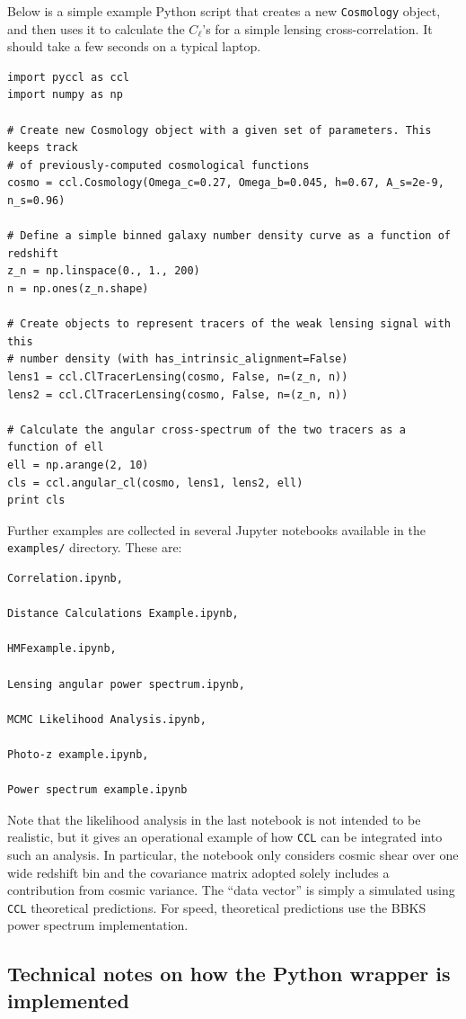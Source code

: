 \documentclass[\docopts]{\docclass}
\begin{document}
Below is a simple example Python script that creates a new {\tt Cosmology} object, and then uses it to calculate the $C_\ell$'s for a simple lensing cross-correlation. It should take a few seconds on a typical laptop.
\begin{verbatim}
import pyccl as ccl
import numpy as np

# Create new Cosmology object with a given set of parameters. This keeps track
# of previously-computed cosmological functions
cosmo = ccl.Cosmology(Omega_c=0.27, Omega_b=0.045, h=0.67, A_s=2e-9, n_s=0.96)

# Define a simple binned galaxy number density curve as a function of redshift
z_n = np.linspace(0., 1., 200)
n = np.ones(z_n.shape)

# Create objects to represent tracers of the weak lensing signal with this
# number density (with has_intrinsic_alignment=False)
lens1 = ccl.ClTracerLensing(cosmo, False, n=(z_n, n))
lens2 = ccl.ClTracerLensing(cosmo, False, n=(z_n, n))

# Calculate the angular cross-spectrum of the two tracers as a function of ell
ell = np.arange(2, 10)
cls = ccl.angular_cl(cosmo, lens1, lens2, ell)
print cls
\end{verbatim}

Further examples are collected in several Jupyter notebooks available in the {\tt examples/} directory. These are:
\begin{verbatim}
Correlation.ipynb,

Distance Calculations Example.ipynb,

HMFexample.ipynb,

Lensing angular power spectrum.ipynb,

MCMC Likelihood Analysis.ipynb,

Photo-z example.ipynb,

Power spectrum example.ipynb
\end{verbatim}

Note that the likelihood analysis in the last notebook is not intended to be realistic, but it gives an operational example of how {\tt CCL} can be integrated into such an analysis. In particular, the notebook only considers cosmic shear over one wide redshift bin and the covariance matrix adopted solely includes a contribution from cosmic variance. The ``data vector'' is simply a simulated using {\tt CCL} theoretical predictions. For speed, theoretical predictions use the BBKS power spectrum implementation.


\subsection{Technical notes on how the Python wrapper is implemented}
\label{sec:python:technical}
\end{document}
